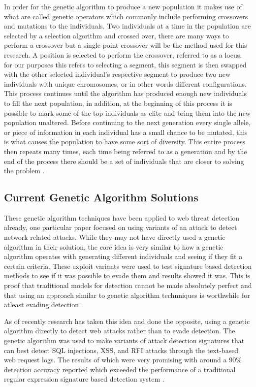 In order for the genetic algorithm to produce a new population it makes use of what are called genetic operators which commonly include performing crossovers and mutations to the individuals.  Two individuals at a time in the population are selected by a selection algorithm and crossed over, there are many ways to perform a crossover but a single-point crossover will be the method used for this research.  A position is selected to perform the crossover, referred to as a locus, for our purposes this refers to selecting a segment, this segment is then swapped with the other selected individual's respective segment to produce two new individuals with unique chromosomes, or in other words different configurations.  This process continues until the algorithm has produced enough new individuals to fill the next population, in addition, at the beginning of this process it is possible to mark some of the top individuals as elite and bring them into the new population unaltered.  Before continuing to the next generation every single allele, or piece of information in each individual has a small chance to be mutated, this is what causes the population to have some sort of diversity.  This entire process then repeats many times, each time being referred to as a generation and by the end of the process there should be a set of individuals that are closer to solving the problem \cite{matlabGenetic}.

\subsection{Current Genetic Algorithm Solutions} \label{sec:currentGenSolutions}

These genetic algorithm techniques have been applied to web threat detection already, one particular paper focused on using variants of an attack to detect network related attacks.  While they may not have directly used a genetic algorithm in their solution, the core idea is very similar to how a genetic algorithm operates with generating different individuals and seeing if they fit a certain criteria.  These exploit variants were used to test signature based detection methods to see if it was possible to evade them and results showed it was.  This is proof that traditional models for detection cannot be made absolutely perfect and that using an approach similar to genetic algorithm technniques is worthwhile for atleast evading detection \cite{testingNetworkBased}.

As of recently research has taken this idea and done the opposite, using a genetic algorithm directly to detect web attacks rather than to evade detection.  The genetic algorithm was used to make variants of attack detection signatures that can best detect SQL injections, XSS, and RFI attacks through the text-based web request logs.  The results of which were very promising with around a 90\% detection accuracy reported which exceeded the performance of a traditional regular expression signature based detection system \cite{mainPaper}.

